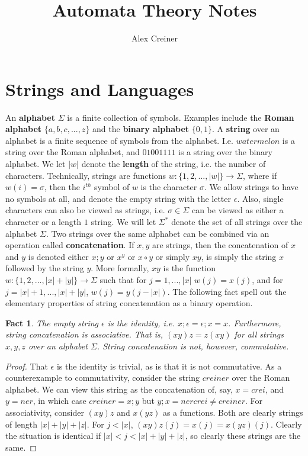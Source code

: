 \documentclass{article}
\title{Automata Theory Notes}
\author{Alex Creiner}
\theoremstyle{definition}
\theoremstyle{plain}
\theoremstyle{theorem}
\newtheorem{fact}{Fact}[section]
\begin{document}
\maketitle
\section{Strings and Languages}
An \textbf{alphabet} $\Sigma$ is a finite collection of symbols. Examples include the \textbf{Roman alphabet} $\{a,b,c,...,z\}$ and the \textbf{binary alphabet} $\{0,1\}$. A \textbf{string} over an alphabet is a finite sequence of symbols from the alphabet. I.e. $watermelon$ is a string over the Roman alphabet, and $01001111$ is a string over the binary alphabet. We let $|w|$ denote the \textbf{length} of the string, i.e. the number of characters. Technically, strings are functions $w: \{1,2,...,|w|\} \to \Sigma$, where if $w(i) = \sigma$, then the $i^{th}$ symbol of $w$ is the character $\sigma$. We allow strings to have no symbols at all, and denote the empty string with the letter $\epsilon$. Also, single characters can also be viewed as strings, i.e. $\sigma \in \Sigma$ can be viewed as either a character or a length $1$ string. We will let $\Sigma^*$ denote the set of all strings over the alphabet $\Sigma$. Two strings over the same alphabet can be combined via an operation called \textbf{concatenation}. If $x,y$ are strings, then the concatenation of $x$ and $y$ is denoted either $x;y$ or $x^y$ or $x \circ y$ or simply $xy$, is simply the string $x$ followed by the string $y$. More formally, $xy$ is the function $w:\{1,2,...,|x|+|y|\} \to \Sigma$ such that for $j=1,...,|x|$ $w(j)=x(j)$, and for $j=|x|+1,...,|x|+|y|$, $w(j) = y(j-|x|)$. The following fact spell out the elementary properties of string concatenation as a binary operation.
\begin{fact}
	The empty string $\epsilon$ is the identity, i.e. $x;\epsilon = \epsilon;x = x$. Furthermore, string concatenation is associative. That is, $(xy)z = z(xy)$ for all strings $x,y,z$ over an alphabet $\Sigma$. String concatenation is not, however, commutative. 
\end{fact}
\begin{proof}
	That $\epsilon$ is the identity is trivial, as is that it is not commutative. As a counterexample to commutativity, consider the string $creiner$ over the Roman alphabet. We can view this string as the concatenation of, say, $x = crei$, and $y=ner$, in which case $creiner = x;y$ but $y;x = nercrei \neq creiner$. For associativity, consider $(xy)z$ and $x(yz)$ as a functions. Both are clearly strings of length $|x|+|y|+|z|$. For $j < |x|$, $(xy)z(j) = x(j) = x(yz)(j)$. Clearly the situation is identical if $|x| < j < |x|+|y|+|z|$, so clearly these strings are the same. 
\end{proof}
\end{document}
